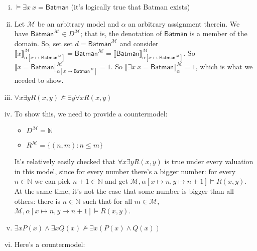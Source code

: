 \begin{enumerate}[\thesection.1]
\begin{enumerate}[(i)]
		\item $\vDash\exists x~x=\mathsf{Batman}$ (it's logically true that Batman exists)
		
		\item[] Let $\mathcal{M}$ be an arbitrary model and $\alpha$ an arbitrary assignment therein. We have $\mathsf{Batman}^\mathcal{M}\in D^\mathcal{M}$; that is, the denotation of $\mathsf{Batman}$ is a member of the domain. So, set set $d=\mathsf{Batman}^\mathcal{M}$ and consider  $\llbracket x\rrbracket^\mathcal{M}_{\alpha[x\mapsto\mathsf{Batman}^\mathcal{M}]}=\mathsf{Batman}^\mathcal{M}=\llbracket\mathsf{Batman}\rrbracket^\mathcal{M}_{\alpha[x\mapsto\mathsf{Batman}^\mathcal{M}]}$. So $\llbracket x=\mathsf{Batman}\rrbracket^\mathcal{M}_{\alpha[x\mapsto\mathsf{Batman}^\mathcal{M}]}=1$. So $\llbracket\exists x~x=\mathsf{Batman}\rrbracket^\mathcal{M}_\alpha=1$, which is what we needed to show.
		
		\item $\forall x\exists y R(x,y)\nvDash \exists y \forall xR(x,y)$ 
		
		\item[] To show this, we need to provide a countermodel:
		
		\begin{itemize}
		
			\item $D^\mathcal{M}=\mathbb{N}$
			
			\item $R^\mathcal{M}=\{(n,m):n\leq m\}$
		
		\end{itemize}
		
		It's relatively easily checked that $\forall x\exists y R(x,y)$ is true under every valuation in this model, since for every number there's a bigger number: for every $n\in\mathbb{N}$ we can pick $n+1\in\mathbb{N}$ and get $\mathcal{M},\alpha[x\mapsto n, y\mapsto n+1]\vDash R(x,y)$. At the same time, it's not the case that some number is bigger than all others: there is $n\in\mathbb{N}$ such that for all $m\in\mathcal{M}$, $\mathcal{M},\alpha[x\mapsto n, y\mapsto n+1]\vDash R(x,y)$.
		
		\item $\exists xP(x)\land \exists x Q(x)\nvDash \exists x(P(x)\land Q(x))$ 
		
		\item[] Here's a countermodel:
		
		\begin{itemize}
		

\end{itemize}
\end{enumerate}
\end{enumerate}
